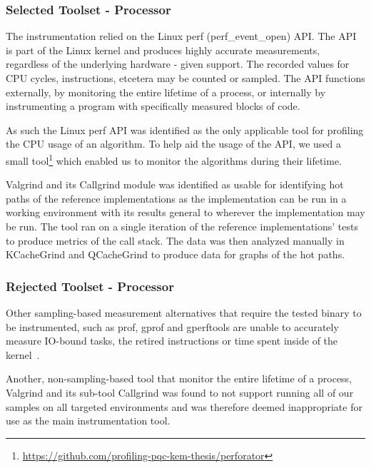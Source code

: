 \subsubsection{Selected Toolset - Processor}
\label{section:method:experiment:phase1:selected-toolset-processor}
The instrumentation relied on the Linux perf (perf\_event\_open) API. The API is part of the Linux kernel and produces highly accurate measurements, regardless of the underlying hardware - given support. The recorded values for CPU cycles, instructions, etcetera may be counted or sampled. The API functions externally, by monitoring the entire lifetime of a process, or internally by instrumenting a program with specifically measured blocks of code.

As such the Linux perf API was identified as the only applicable tool for profiling the CPU usage of an algorithm. To help aid the usage of the API, we used a small tool\footnote{\href{https://github.com/profiling-pqc-kem-thesis/perforator}{https://github.com/profiling-pqc-kem-thesis/perforator}} which enabled us to monitor the algorithms during their lifetime.

Valgrind and its Callgrind module was identified as usable for identifying hot paths of the reference implementations as the implementation can be run in a working environment with its results general to wherever the implementation may be run. The tool ran on a single iteration of the reference implementations' tests to produce metrics of the call stack. The data was then analyzed manually in KCacheGrind and QCacheGrind to produce data for graphs of the hot paths.

\subsubsection{Rejected Toolset - Processor}
\label{section:method:experiment:phase1:rejected-toolset-processor}
Other sampling-based measurement alternatives that require the tested binary to be instrumented, such as prof, gprof and gperftools are unable to accurately measure IO-bound tasks, the retired instructions or time spent inside of the kernel~\cite{gprof}.

Another, non-sampling-based tool that monitor the entire lifetime of a process, Valgrind and its sub-tool Callgrind was found to not support running all of our samples on all targeted environments and was therefore deemed inappropriate for use as the main instrumentation tool.

